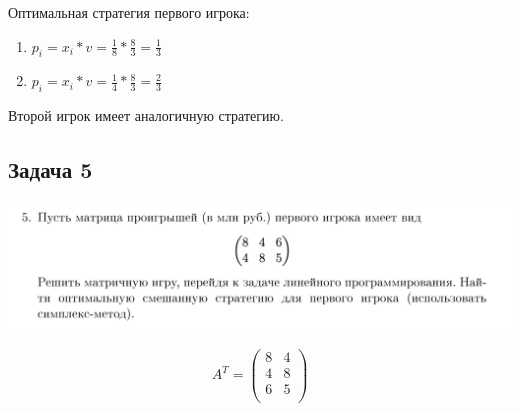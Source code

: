 \documentclass[9pt, a4paper]{article}
\begin{document}
    Оптимальная стратегия первого игрока:
    \begin{enumerate}
        \item $p_i = x_i * v = \frac{1}{8} * \frac{8}{3} = \frac{1}{3}$
        \item $p_i = x_i * v = \frac{1}{4} * \frac{8}{3} = \frac{2}{3}$
    \end{enumerate}

    Второй игрок имеет аналогичную стратегию.

    \newpage

    \subsection{Задача 5}\label{subsec:task5}
    \includegraphics[width=1\textwidth]{docs/5}

    \begin{equation}
        A^T =
        \begin{pmatrix}
            8 & 4 \\
            4 & 8 \\
            6 & 5 \\
        \end{pmatrix}\label{eq:equation26}
    \end{equation}
\end{document}
